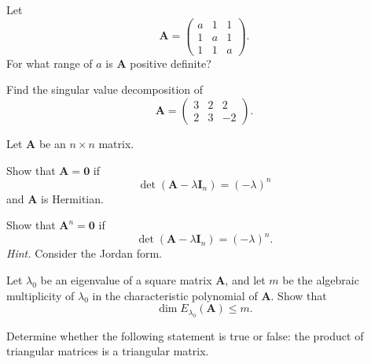\documentclass[11pt,oneside]{article}
\begin{document}
\begin{problem}
Let
\[
\mathbf A=
\begin{pmatrix}
a&1&1\\
1&a&1\\
1&1&a
\end{pmatrix}.
\]
For what range of $a$ is $\mathbf A$ positive definite?
\end{problem}

\begin{problem}
Find the singular value decomposition of
\[
\mathbf A=
\begin{pmatrix}
3&2&2\\
2&3&-2
\end{pmatrix}.
\]
\end{problem}

\begin{problem}
Let $\mathbf A$ be an $n\times n$ matrix.
\begin{problemsubparts}
\item Show that $\mathbf A=\mathbf 0$ if
\[
\det(\mathbf A-\lambda\mathbf I_n)=(-\lambda)^n
\]
and $\mathbf A$ is Hermitian.
\item Show that $\mathbf A^n=\mathbf 0$ if
\[
\det(\mathbf A-\lambda\mathbf I_n)=(-\lambda)^n.
\]
\textit{Hint.} Consider the Jordan form.
\end{problemsubparts}
\end{problem}

\begin{problem}
Let $\lambda_0$ be an eigenvalue of a square matrix $\mathbf A$, and let $m$ be the algebraic multiplicity of $\lambda_0$ in the characteristic polynomial of $\mathbf A$. Show that
\[
\dim E_{\lambda_0}(\mathbf A)\le m.
\]
\end{problem}

\begin{problem}
Determine whether the following statement is true or false: the product of triangular matrices is a triangular matrix.
\end{problem}
\end{document}
